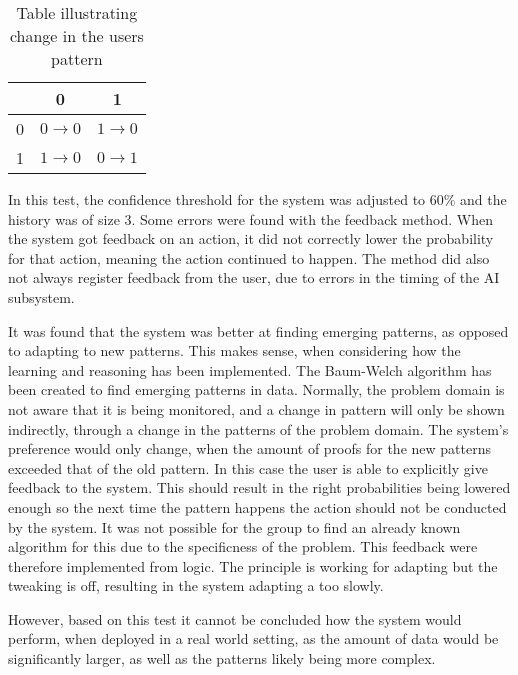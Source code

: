 \begin{table}[htbp]
\begin{center}
  \begin{tabular}{| c | c | c |}
    \hline
        & 0                 & 1                 \\ \hline
      0 & $0 \rightarrow 0$ & $1 \rightarrow 0$ \\ \hline
      1 & $1 \rightarrow 0$ & $0 \rightarrow 1$ \\
    \hline
  \end{tabular}
  \caption{Table illustrating change in the users pattern}\label{Table:userPatternChange}
\end{center}
\end{table}
In this test, the confidence threshold for the system was adjusted to 60\% and the history was of size 3.
Some errors were found with the feedback method. When the system got feedback on an action, it did not correctly lower the probability for that action, meaning the action continued to happen. The method did also not always register feedback from the user, due to errors in the timing of the AI subsystem.

It was found that the system was better at finding emerging patterns, as opposed to adapting to new patterns. This makes sense, when considering how the learning and reasoning has been implemented. The Baum-Welch algorithm has been created to find emerging patterns in data. Normally, the problem domain is not aware that it is being monitored, and a change in pattern will only be shown indirectly, through a change in the patterns of the problem domain. The system's preference would only change, when the amount of proofs for the new patterns exceeded that of the old pattern. In this case the user is able to explicitly give feedback to the system. This should result in the right probabilities being lowered enough so the next time the pattern happens the action should not be conducted by the system. It was not possible for the group to find an already known algorithm for this due to the specificness of the problem. This feedback were therefore implemented from logic. The principle is working for adapting but the tweaking is off, resulting in the system adapting a too slowly.

However, based on this test it cannot be concluded how the system would perform, when deployed in a real world setting, as the amount of data would be significantly larger, as well as the patterns likely being more complex.
